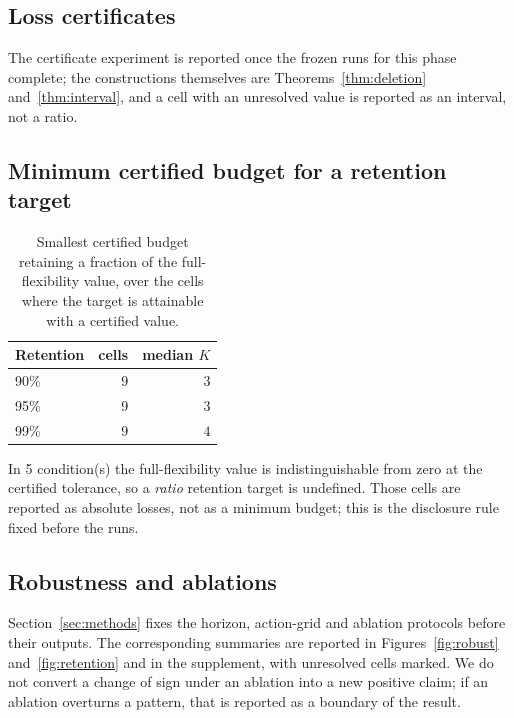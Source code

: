 \subsection{Loss certificates}
The certificate experiment is reported once the frozen runs for this phase complete; the constructions themselves are Theorems~\ref{thm:deletion} and~\ref{thm:interval}, and a cell with an unresolved value is reported as an interval, not a ratio.

\subsection{Minimum certified budget for a retention target}
\begin{table}[!htb]\centering\small
\caption{Smallest certified budget retaining a fraction of the full-flexibility value, over the cells where the target is attainable with a certified value.}
\label{tab:retention}
\begin{tabular}{lrr}
\toprule
Retention & cells & median $K$ \\
\midrule
90\% & 9 & $3$ \\
95\% & 9 & $3$ \\
99\% & 9 & $4$ \\
\bottomrule
\end{tabular}
\end{table}

In 5 condition(s) the full-flexibility value is indistinguishable from zero at the certified tolerance, so a \emph{ratio} retention target is undefined. Those cells are reported as absolute losses, not as a minimum budget; this is the disclosure rule fixed before the runs.

\subsection{Robustness and ablations}
Section~\ref{sec:methods} fixes the horizon, action-grid and ablation protocols before their outputs. The corresponding summaries are reported in Figures~\ref{fig:robust} and~\ref{fig:retention} and in the supplement, with unresolved cells marked. We do not convert a change of sign under an ablation into a new positive claim; if an ablation overturns a pattern, that is reported as a boundary of the result.
